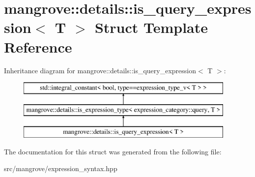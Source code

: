 \hypertarget{structmangrove_1_1details_1_1is__query__expression}{}\section{mangrove\+:\+:details\+:\+:is\+\_\+query\+\_\+expression$<$ T $>$ Struct Template Reference}
\label{structmangrove_1_1details_1_1is__query__expression}
Inheritance diagram for mangrove\+:\+:details\+:\+:is\+\_\+query\+\_\+expression$<$ T $>$\+:\begin{figure}[H]
\begin{center}
\leavevmode
\includegraphics[height=3.000000cm]{structmangrove_1_1details_1_1is__query__expression}
\end{center}
\end{figure}


The documentation for this struct was generated from the following file\+:\begin{DoxyCompactItemize}
\item 
src/mangrove/expression\+\_\+syntax.\+hpp\end{DoxyCompactItemize}
